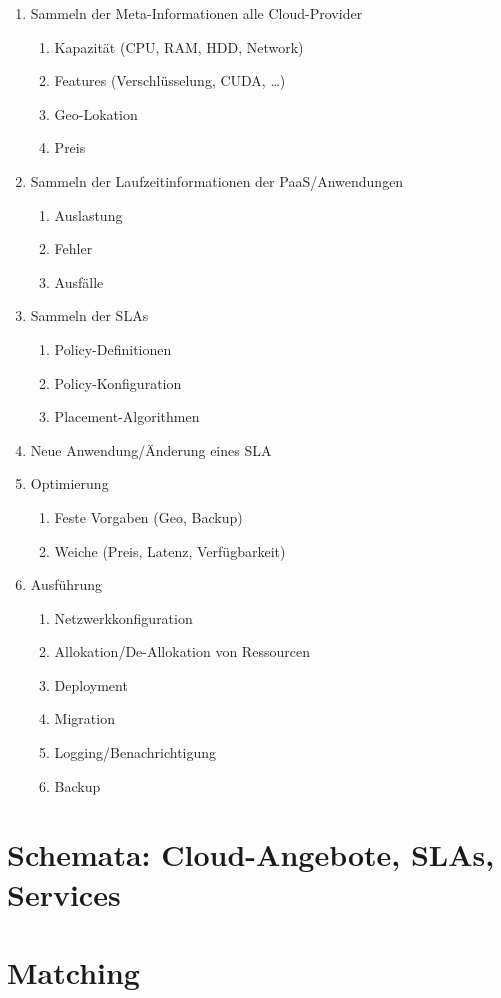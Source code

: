 \begin{enumerate}
	
	\item Sammeln der Meta-Informationen alle Cloud-Provider
	\begin{enumerate}
		\item Kapazität (CPU, RAM, HDD, Network)
		\item Features (Verschlüsselung, CUDA, …)
		\item Geo-Lokation 
		\item Preis
	\end{enumerate}
	
	\item Sammeln der Laufzeitinformationen der PaaS/Anwendungen
	\begin{enumerate}
		\item Auslastung
		\item Fehler
		\item Ausfälle
	\end{enumerate}
	
	\item Sammeln der SLAs
	\begin{enumerate}
		\item Policy-Definitionen
		\item Policy-Konfiguration
		\item Placement-Algorithmen
	\end{enumerate}

	\item Neue Anwendung/Änderung eines SLA
	
	\item Optimierung
	\begin{enumerate}
		\item Feste Vorgaben (Geo, Backup)
		\item Weiche (Preis, Latenz, Verfügbarkeit)
	\end{enumerate}

	
	\item Ausführung
	\begin{enumerate}
		\item Netzwerkkonfiguration
		\item Allokation/De-Allokation von Ressourcen
		\item Deployment
		\item Migration
		\item Logging/Benachrichtigung
		\item Backup
	\end{enumerate}

\end{enumerate}

\section{Schemata: Cloud-Angebote, SLAs, Services}

\section{Matching}
%
%
%
